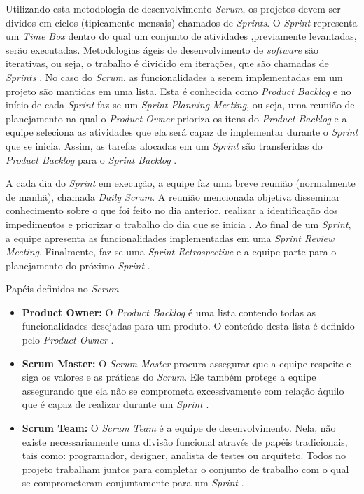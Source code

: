 \documentclass{acm_proc_article-sp}
\begin{document}
Utilizando esta metodologia de desenvolvimento \textit{Scrum}, os projetos devem ser dividos em ciclos (tipicamente mensais) chamados de \textit{Sprints}. O \textit{Sprint} representa um \textit{Time Box} dentro do qual um conjunto de atividades ,previamente levantadas, serão executadas. Metodologias ágeis de desenvolvimento de \textit{software} são iterativas, ou seja, o trabalho é dividido em iterações, que são chamadas de \textit{Sprints} \cite{scrum:agil}. No caso do \textit{Scrum}, as funcionalidades a serem implementadas em um projeto são mantidas em uma lista. Esta é conhecida como \textit{Product Backlog} e no início de cada \textit{Sprint} faz-se um \textit{Sprint Planning Meeting}, ou seja, uma reunião de planejamento na qual o \textit{Product Owner} prioriza os itens do \textit{Product Backlog} e a equipe seleciona as atividades que ela será capaz de implementar durante o \textit{Sprint} que se inicia. Assim, as tarefas alocadas em um \textit{Sprint} são transferidas do \textit{Product Backlog} para o \textit{Sprint Backlog} \cite{scrum:agil}.

A cada dia do \textit{Sprint} em execução, a equipe faz uma breve reunião (normalmente de manhã), chamada \textit{Daily Scrum}. A reunião mencionada objetiva disseminar conhecimento sobre o que foi feito no dia anterior, realizar a identificação dos impedimentos e priorizar o trabalho do dia que se inicia \cite{scrum:agil}. Ao final de um \textit{Sprint}, a equipe apresenta as funcionalidades implementadas em uma \textit{Sprint Review Meeting}. Finalmente, faz-se uma \textit{Sprint Retrospective} e a equipe parte para o planejamento do próximo \textit{Sprint} \cite{scrum:agil}.

Papéis definidos no \textit{Scrum}

\begin{itemize}
\item \textbf{Product Owner:}  O \textit{Product Backlog} é uma lista contendo todas as funcionalidades desejadas para um produto. O conteúdo desta lista é definido pelo \textit{Product Owner} \cite{scrum:agil}.
\item \textbf{Scrum Master:} O \textit{Scrum Master} procura assegurar que a equipe respeite e siga os valores e as práticas do \textit{Scrum}. Ele também protege a equipe assegurando que ela não se comprometa excessivamente com relação àquilo que é capaz de realizar durante um \textit{Sprint} \cite{scrum:agil}.
\item \textbf{Scrum Team:} O \textit{Scrum Team} é a equipe de desenvolvimento. Nela, não existe necessariamente uma divisão funcional através de papéis tradicionais, tais como: programador, designer, analista de testes ou arquiteto. Todos no projeto trabalham juntos para completar o conjunto de trabalho com o qual se comprometeram conjuntamente para um \textit{Sprint} \cite{scrum:agil}.
\end{itemize}
\end{document}
